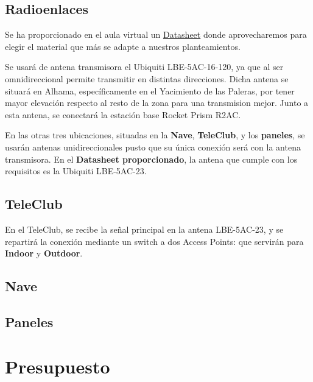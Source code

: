 \documentclass{article}
\begin{document}
\subsection{Radioenlaces}

Se ha proporcionado en el aula virtual un \href{http://www.microcom.com.ar/fotos/ficha7097LBE-M5-23.compressed.pdf}{Datasheet} donde aprovecharemos para elegir el material que más se adapte a nuestros planteamientos. 

\quad

Se usará de antena transmisora el Ubiquiti LBE-5AC-16-120, ya que al ser omnidireccional permite transmitir en distintas direcciones. Dicha antena se situará en Alhama, específicamente en el Yacimiento de las Paleras, por tener mayor elevación respecto al resto de la zona para una transmision mejor. Junto a esta antena, se conectará la estación base Rocket Prism R2AC.

\quad

En las otras tres ubicaciones, situadas en la \textbf{Nave}, \textbf{TeleClub}, y los \textbf{paneles}, se usarán antenas unidireccionales pusto que su única conexión será con la antena transmisora. En el \textbf{Datasheet proporcionado}, la antena que cumple con los requisitos es la Ubiquiti LBE-5AC-23.

\subsection{TeleClub}

En el TeleClub, se recibe la señal principal en la antena LBE-5AC-23, y se repartirá la conexión mediante un switch a dos Access Points: que servirán para \textbf{Indoor} y \textbf{Outdoor}.    


\subsection{Nave}
\subsection{Paneles}

\section{Presupuesto}
\end{document}
